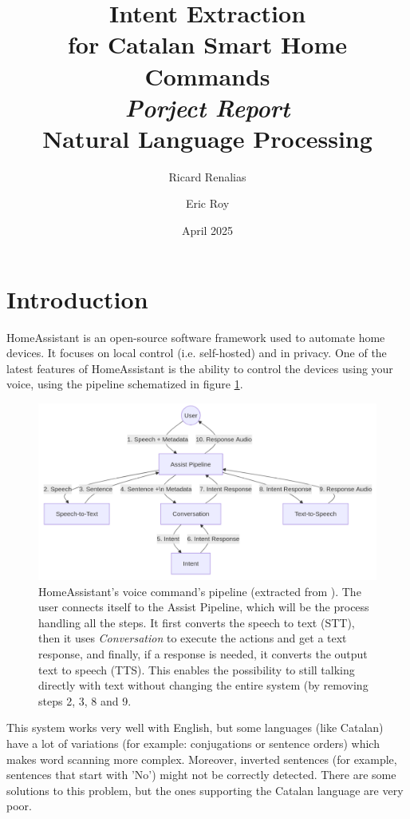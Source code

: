 \documentclass{article}
\title{\textbf{Intent Extraction\\ for Catalan Smart Home Commands}\\\textit{Porject Report}\\\Large{Natural Language Processing}}
\author{Ricard Renalias \and Eric Roy}
\date{April 2025}
\begin{document}
\maketitle
\tableofcontents
\newpage

\section{Introduction}

HomeAssistant \cite{homeassistant} is an open-source software framework used to automate home devices. It focuses on local control (i.e. self-hosted) and in privacy.
One of the latest features of HomeAssistant is the ability to control the devices using your voice, using the pipeline schematized in figure \ref{fig:ha-pipeline}.

\begin{figure}[H]
    \centering
    \includegraphics[width=0.75\linewidth]{pipeline_home_assistant.png}
    \caption{
    HomeAssistant's voice command's pipeline (extracted from \cite{homeassistantvoice}).
    The user connects itself to the Assist Pipeline, which will be the process handling all
    the steps. It first converts the speech to text (STT), then it uses \textit{Conversation} to
    execute the actions and get a text response, and finally, if a response is needed, it
    converts the output text to speech (TTS). This enables the possibility to still talking directly with text without changing the entire system (by removing steps 2, 3, 8 and 9.
    }
    \label{fig:ha-pipeline}
\end{figure}

This system works very well with English, but some languages (like Catalan) have a lot of variations (for example: conjugations or sentence orders) which makes word scanning more complex. Moreover, inverted sentences (for example, sentences that start with 'No') might not be correctly detected. There are some solutions to this problem, but the ones supporting the Catalan language are very poor.
\end{document}

